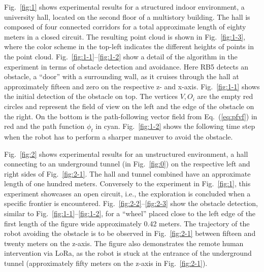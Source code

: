 \documentclass[letterpaper,10pt,conference,twoside]{IEEEtran}
\theoremstyle{definition}
\begin{document}

Fig.~\ref{fig:1} shows experimental results for a structured indoor environment, a university hall, located on the second floor of a multistory building. The hall is composed of four connected corridors for a total approximate length of eighty meters in a closed circuit. %
The resulting point cloud is shown in Fig.~\ref{fig:1-3}, where the color scheme in the top-left indicates the different heights of points in the point cloud. 
%
%
Fig.~\ref{fig:1-1}--\ref{fig:1-2} show a detail of the algorithm in the experiment in terms of obstacle detection and avoidance. Here RB5 detects an obstacle, a ``door'' with a surrounding wall, as it cruises through the hall at approximately fifteen and zero on the respective z- and x-axis. Fig.~\ref{fig:1-1} shows the initial detection of the obstacle on top. The vertices $V, O_i$ are the empty red circles and represent the field of view on the left and the edge of the obstacle on the right. On the bottom is the path-following vector field from Eq.~(\ref{eq:pfvf}) in red and the path function $\phi_t$ in cyan. Fig.~\ref{fig:1-2} shows the following time step when the robot has to perform a sharper maneuver to avoid the obstacle.

Fig.~\ref{fig:2} shows experimental results for an unstructured environment, a hall connecting to an underground tunnel (in Fig.~\ref{fig:0}) on the respective left and right sides of Fig.~\ref{fig:2-1}. The hall and tunnel combined have an approximate length of one hundred meters. Conversely to the experiment in Fig.~\ref{fig:1}, this experiment showcases an open circuit, i.e., the exploration is concluded when a specific frontier is encountered. Fig.~\ref{fig:2-2}--\ref{fig:2-3} show the obstacle detection, similar to Fig.~\ref{fig:1-1}--\ref{fig:1-2}, for a ``wheel'' placed close to the left edge of the first length of the figure wide approximately 0.42 meters. The trajectory of the robot avoiding the obstacle is to be observed in Fig.~\ref{fig:2-1} between fifteen and twenty meters on the z-axis. The figure also demonstrates the remote human intervention via LoRa, as the robot is stuck at the entrance of the underground tunnel (approximately fifty meters on the z-axis in Fig.~\ref{fig:2-1}).
\end{document}
